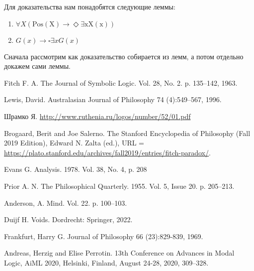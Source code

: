 \documentclass[openany]{book}
\theoremstyle{plain}
\theoremstyle{definition}
\begin{document}
Для доказательства нам понадобятся следующие леммы:
\begin{enumerate}
\item \(\forall X (\mathrm{Pos(X) \to \Diamond \exists x X(x)})\)
\item \(G(x) \to \square \exists x G(x)\)
\end{enumerate}

Сначала рассмотрим как доказательство собирается из лемм, а потом отдельно докажем сами леммы.

\begin{thebibliography}{2}

Fitch F. A. 
\newblock The Journal of Symbolic Logic. Vol. 28, No. 2. p. 135--142, 1963.

Lewis, David. 
\newblock Australasian Journal of Philosophy 74 (4):549--567, 1996.

Шрамко Я. 
\newblock  \url{http://www.ruthenia.ru/logos/number/52/01.pdf}

Brogaard, Berit and Joe Salerno.
\newblock The Stanford Encyclopedia of Philosophy (Fall 2019 Edition), Edward N. Zalta (ed.), URL = \url{https://plato.stanford.edu/archives/fall2019/entries/fitch-paradox/}.

Evans G. 
\newblock Analysis. 1978. Vol. 38, No. 4, p. 208

Prior A. N.
\newblock The Philosophical Quarterly. 1955. Vol. 5, Issue 20. p. 205--213.

Anderson, A.
\newblock Mind. Vol. 22. p. 100--103.

Duijf H.
\newblock Voids. Dordrecht: Springer, 2022.

Frankfurt, Harry G.
\newblock Journal of Philosophy 66 (23):829-839, 1969.

Andreas, Herzig and Elise Perrotin.
\newblock 13th Conference on Advances in Modal Logic, AiML 2020, Helsinki, Finland,
                  August 24-28, 2020, 309--328.
                  

\end{thebibliography}
\end{document}
